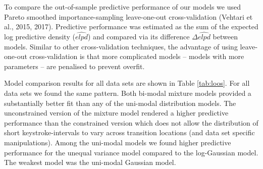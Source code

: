 \documentclass[
  english,
  man,floatsintext]{apa7}
\begin{document}
To compare the out-of-sample predictive performance of our models we used Pareto smoothed importance-sampling leave-one-out cross-validation (Vehtari et al., 2015, 2017). Predictive performance was estimated as the sum of the expected log predictive density (\(\widehat{elpd}\)) and compared via its difference \(\Delta\widehat{elpd}\) between models. Similar to other cross-validation techniques, the advantage of using leave-one-out cross-validation is that more complicated models -- models with more parameters -- are penalised to prevent overfit.

Model comparison results for all data sets are shown in Table \ref{tab:loos}. For all data sets we found the same pattern. Both bi-modal mixture models provided a substantially better fit than any of the uni-modal distribution models. The unconstrained version of the mixture model rendered a higher predictive performance than the constrained version which does not allow the distribution of short keystroke-intervals to vary across transition locations (and data set specific manipulations). Among the uni-modal models we found higher predictive performance for the unequal variance model compared to the log-Gaussian model. The weakest model was the uni-modal Gaussian model.
\end{document}
